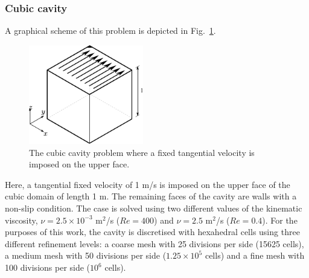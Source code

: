 \documentclass[final,3p,times,11pt,onecolumn]{myElsarticle}
\numberwithin{equation}{section}
\begin{document}
\subsubsection{Cubic cavity}
 A graphical scheme of this problem is depicted in Fig.~\ref{Fig:Cavity}.
\begin{figure}[t!!!]
\centering
\includegraphics[width=5cm]{fig/Cases/Cavity.pdf}
\caption{The cubic cavity problem where a fixed tangential velocity is imposed on the upper face.}
\label{Fig:Cavity}
\end{figure} 
Here, a tangential fixed velocity of 1 m/s is imposed on the upper face of the cubic domain of length 1 m. The remaining faces of the cavity are walls with a non-slip condition. The case is solved using two different values of the kinematic viscosity, $\nu = 2.5 \times 10^{-3}$ m$^2$/s ($Re=400$) and $\nu = 2.5$ m$^2$/s ($Re=0.4$). For the purposes of this work, the cavity is discretised with hexahedral cells using three different refinement levels: a coarse mesh with 25 divisions per side (15625 cells), a medium mesh with 50 divisions per side ($1.25 \times 10^{5}$ cells) and a fine mesh with 100 divisions per side ($10^{6}$ cells).
\end{document}

